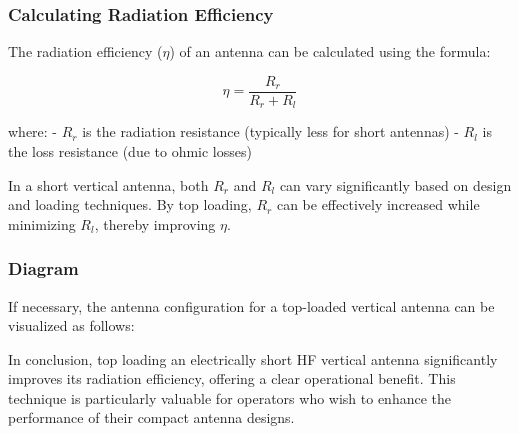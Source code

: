 \subsubsection{Calculating Radiation Efficiency}
The radiation efficiency (\(\eta\)) of an antenna can be calculated using the formula:

\[
\eta = \frac{R_r}{R_r + R_l}
\]

where:
- \(R_r\) is the radiation resistance (typically less for short antennas)
- \(R_l\) is the loss resistance (due to ohmic losses)

In a short vertical antenna, both \(R_r\) and \(R_l\) can vary significantly based on design and loading techniques. By top loading, \(R_r\) can be effectively increased while minimizing \(R_l\), thereby improving \(\eta\).

\subsubsection{Diagram}
If necessary, the antenna configuration for a top-loaded vertical antenna can be visualized as follows:

\begin{center}
\usetikzlibrary{shapes, arrows}
\end{center}

In conclusion, top loading an electrically short HF vertical antenna significantly improves its radiation efficiency, offering a clear operational benefit. This technique is particularly valuable for operators who wish to enhance the performance of their compact antenna designs.
